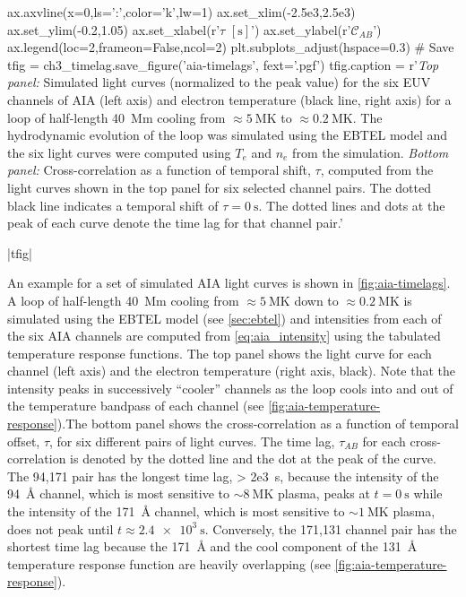 \begin{pycode}
ax.axvline(x=0,ls=':',color='k',lw=1)
ax.set_xlim(-2.5e3,2.5e3)
ax.set_ylim(-0.2,1.05)
ax.set_xlabel(r'$\tau$ $[\si{\second}]$')
ax.set_ylabel(r'$\mathcal{C}_{AB}$')
ax.legend(loc=2,frameon=False,ncol=2)
plt.subplots_adjust(hspace=0.3)
# Save
tfig = ch3_timelag.save_figure('aia-timelags', fext='.pgf')
tfig.caption = r'\textit{Top panel:} Simulated light curves (normalized to the peak value) for the six EUV channels of AIA (left axis) and electron temperature (black line, right axis) for a loop of half-length \SI{40}{\mega\m} cooling from $\approx\SI{5}{\mega\kelvin}$ to $\approx\SI{0.2}{\mega\kelvin}$. The hydrodynamic evolution of the loop was simulated using the EBTEL model and the six light curves were computed using $T_e$ and $n_e$ from the simulation. \textit{Bottom panel:} Cross-correlation as a function of temporal shift, $\tau$, computed from the light curves shown in the top panel for six selected channel pairs. The dotted black line indicates a temporal shift of $\tau=\SI{0}{\second}$. The dotted lines and dots at the peak of each curve denote the time lag for that channel pair.'
\end{pycode}
|tfig|

An example for a set of simulated AIA light curves is shown in \autoref{fig:aia-timelags}. A loop of half-length \SI{40}{\mega\m} cooling from $\approx\SI{5}{\mega\kelvin}$ down to $\approx\SI{0.2}{\mega\kelvin}$ is simulated using the EBTEL model (see \autoref{sec:ebtel}) and intensities from each of the six AIA channels are computed from \autoref{eq:aia_intensity} using the tabulated temperature response functions. The top panel shows the light curve for each channel (left axis) and the electron temperature (right axis, black). Note that the intensity peaks in successively ``cooler'' channels as the loop cools into and out of the temperature bandpass of each channel (see \autoref{fig:aia-temperature-response}).The bottom panel shows the cross-correlation as a function of temporal offset, $\tau$, for six different pairs of light curves. The time lag, $\tau_{AB}$ for each cross-correlation is denoted by the dotted line and the dot at the peak of the curve. The 94,171 pair has the longest time lag, \SI{> 2e3}{\second}, because the intensity of the \SI{94}{\angstrom} channel, which is most sensitive to $\sim\SI{8}{\mega\kelvin}$ plasma, peaks at $t=\SI{0}{\second}$ while the intensity of the \SI{171}{\angstrom} channel, which is most sensitive to $\sim\SI{1}{\mega\kelvin}$ plasma, does not peak until $t\approx\SI{2.4e3}{\second}$. Conversely, the 171,131 channel pair has the shortest time lag because the \SI{171}{\angstrom} and the cool component of the \SI{131}{\angstrom} temperature response function are heavily overlapping (see \autoref{fig:aia-temperature-response}). 


